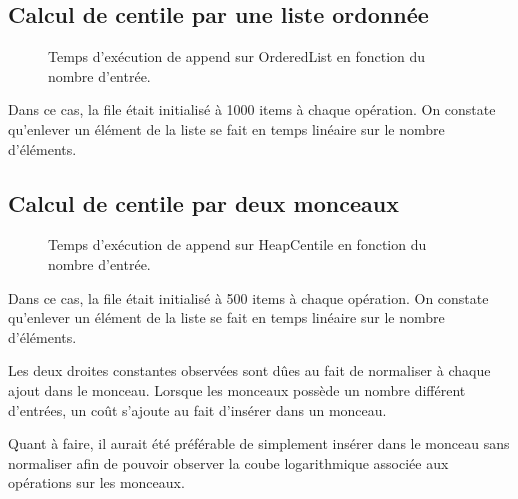 \documentclass[french]{article}
\begin{document}
\subsection{Calcul de centile par une liste ordonnée}
\begin{figure}
  \centering
  
  \caption{Temps d'exécution de \textsf{append} sur \textsf{OrderedList} en fonction du nombre d'entrée.}
\end{figure}
Dans ce cas, la file était initialisé à 1000 items à chaque opération. On
constate qu'enlever un élément de la liste se fait en temps linéaire sur le
nombre d'éléments.

\subsection{Calcul de centile par deux monceaux}
\begin{figure}
  \centering
  
  \caption{Temps d'exécution de \textsf{append} sur \textsf{HeapCentile} en fonction du nombre d'entrée.}
\end{figure}
Dans ce cas, la file était initialisé à 500 items à chaque opération. On
constate qu'enlever un élément de la liste se fait en temps linéaire sur le
nombre d'éléments.

Les deux droites constantes observées sont dûes au fait de normaliser à chaque
ajout dans le monceau. Lorsque les monceaux possède un nombre différent
d'entrées, un coût s'ajoute au fait d'insérer dans un monceau.

Quant à faire, il aurait été préférable de simplement insérer dans le monceau
sans normaliser afin de pouvoir observer la coube logarithmique associée aux
opérations sur les monceaux.
\end{document}
